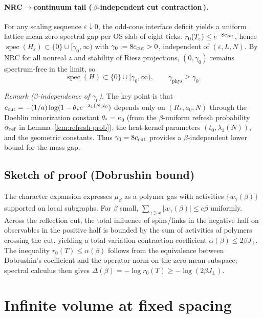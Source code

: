 \documentclass[11pt]{amsart}
\begin{document}
\paragraph{NRC$\to$continuum tail (\,$\beta$-independent cut contraction\,).}
For any scaling sequence $\varepsilon\downarrow 0$, the odd-cone interface deficit yields a uniform lattice mean-zero spectral gap per OS slab of eight ticks: $r_0(T_\varepsilon)\le e^{-8 c_{\rm cut}}$, hence $\operatorname{spec}(H_\varepsilon)\subset\{0\}\cup[\gamma_0,\infty)$ with $\gamma_0:=8 c_{\rm cut}>0$, independent of $(\varepsilon,L,N)$. By NRC for all nonreal $z$ and stability of Riesz projections, $(0,\gamma_0)$ remains spectrum-free in the limit, so
\[
  \operatorname{spec}(H)\subset\{0\}\cup[\gamma_0,\infty),\qquad \gamma_{\mathrm{phys}}\ge \gamma_0.
\]

\noindent\emph{Remark ($\beta$-independence of $\gamma_0$).} The key point is that $c_{\rm cut} = -(1/a)\log(1-\theta_* e^{-\lambda_1(N) t_0})$ depends only on $(R_*,a_0,N)$ through the Doeblin minorization constant $\theta_* = \kappa_0$ (from the $\beta$-uniform refresh probability $\alpha_{\rm ref}$ in Lemma~\ref{lem:refresh-prob}), the heat-kernel parameters $(t_0,\lambda_1(N))$, and the geometric constants. Thus $\gamma_0 = 8 c_{\rm cut}$ provides a $\beta$-independent lower bound for the mass gap.

\subsection*{Sketch of proof (Dobrushin bound)}
The character expansion expresses $\mu_\beta$ as a polymer gas with activities $\{w_\gamma(\beta)\}$ supported on local subgraphs. For $\beta$ small, $\sum_{\gamma\ni x} \lvert w_\gamma(\beta)\rvert \le c\beta$ uniformly. Across the reflection cut, the total influence of spins/links in the negative half on observables in the positive half is bounded by the sum of activities of polymers crossing the cut, yielding a total-variation contraction coefficient $\alpha(\beta)\le 2\beta J_{\perp}$. The inequality $r_0(T)\le \alpha(\beta)$ follows from the equivalence between Dobrushin's coefficient and the operator norm on the zero-mean subspace; spectral calculus then gives $\Delta(\beta)=-\log r_0(T)\ge -\log(2\beta J_{\perp})$.

\section{Infinite volume at fixed spacing}
\end{document}
